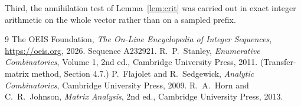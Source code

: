 \documentclass[11pt,a4paper]{article}
\theoremstyle{plain}
\theoremstyle{definition}
\begin{document}
Third, the annihilation test of Lemma~\ref{lem:crit} was carried out in exact integer
arithmetic on the whole vector rather than on a sampled prefix.

\begin{thebibliography}{9}
 The OEIS Foundation, \emph{The On-Line Encyclopedia of Integer
Sequences}, \url{https://oeis.org}, 2026. Sequence A232921.
 R.~P.~Stanley, \emph{Enumerative Combinatorics}, Volume 1, 2nd ed.,
Cambridge University Press, 2011. (Transfer-matrix method, Section 4.7.)
 P.~Flajolet and R.~Sedgewick, \emph{Analytic Combinatorics}, Cambridge
University Press, 2009.
 R.~A.~Horn and C.~R.~Johnson, \emph{Matrix Analysis}, 2nd ed., Cambridge
University Press, 2013.
\end{thebibliography}
\end{document}
